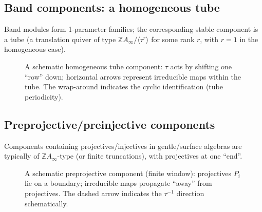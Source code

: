 \documentclass[11pt,oneside]{amsbook}
\numberwithin{equation}{section}
\theoremstyle{plain}
\theoremstyle{definition}
\theoremstyle{remark}
\begin{document}
\subsection{Band components: a homogeneous tube}
Band modules form 1-parameter families; the corresponding stable component is a tube (a translation quiver of type
$\mathbb Z A_\infty/\langle\tau^r\rangle$ for some rank $r$, with $r=1$ in the homogeneous case).

\begin{figure}[t]
\centering
{}
\caption{A schematic homogeneous tube component: $\tau$ acts by shifting one ``row'' down; horizontal arrows represent irreducible maps within the tube. The wrap-around indicates the cyclic identification (tube periodicity).}
\label{fig:ar_tube}
\end{figure}

\subsection{Preprojective/preinjective components}
Components containing projectives/injectives in gentle/surface algebras are typically of
$\mathbb Z A_\infty$-type (or finite truncations), with projectives at one ``end''.

\begin{figure}[t]
\centering
{}
\caption{A schematic preprojective component (finite window): projectives $P_i$ lie on a boundary; irreducible maps propagate ``away'' from projectives. The dashed arrow indicates the $\tau^{-1}$ direction schematically.}
\label{fig:ar_preprojective}
\end{figure}
\end{document}
